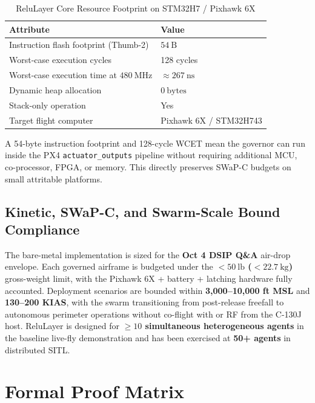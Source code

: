 \documentclass[11pt]{article}
\begin{document}
\begin{table}[htbp]
\centering
\caption{ReluLayer Core Resource Footprint on STM32H7 / Pixhawk 6X}
\label{tab:footprint}
\begin{tabularx}{\textwidth}{@{}lX@{}}
\toprule
\textbf{Attribute} & \textbf{Value} \\
\midrule
Instruction flash footprint (Thumb-2) & $54\ \text{B}$ \\
Worst-case execution cycles & 128 cycles \\
Worst-case execution time at $480\ \text{MHz}$ & $\approx 267\ \text{ns}$ \\
Dynamic heap allocation & $0\ \text{bytes}$ \\
Stack-only operation & Yes \\
Target flight computer & Pixhawk 6X / STM32H743 \\
\bottomrule
\end{tabularx}
\end{table}

A 54-byte instruction footprint and 128-cycle WCET mean the governor can run inside the PX4 \texttt{actuator\_outputs} pipeline without requiring additional MCU, co-processor, FPGA, or memory. This directly preserves SWaP-C budgets on small attritable platforms.

\subsection{Kinetic, SWaP-C, and Swarm-Scale Bound Compliance}
\label{subsec:kinetic}

The bare-metal implementation is sized for the \textbf{Oct 4 DSIP Q\&A} air-drop envelope. Each governed airframe is budgeted under the \textbf{$< 50\ \text{lb}$ ($< 22.7\ \text{kg}$)} gross-weight limit, with the Pixhawk 6X + battery + latching hardware fully accounted. Deployment scenarios are bounded within \textbf{3,000--10,000 ft MSL} and \textbf{130--200 KIAS}, with the swarm transitioning from post-release freefall to autonomous perimeter operations without co-flight with or RF from the C-130J host. ReluLayer is designed for \textbf{$\ge 10$ simultaneous heterogeneous agents} in the baseline live-fly demonstration and has been exercised at \textbf{50+ agents} in distributed SITL.

\section{Formal Proof Matrix}
\label{sec:proofs}
\end{document}
